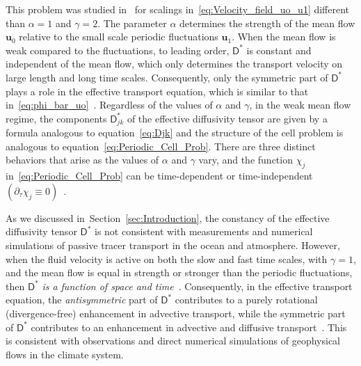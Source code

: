 \documentclass[leqno,onefignum,onetabnum]{siamltex1213}
\newcommand{\secref}[1]{Section~\ref{#1}}
\newcommand{\Dm}{\mathsf{D}}
\newcommand{\vecu}{\boldsymbol{u}}
\begin{document}
This problem was studied in~\cite{Pavliotis:PHD_Thesis} for 
scalings in~\eqref{eq:Velocity_field_uo_u1} different than $\alpha=1$ and
$\gamma=2$. The parameter $\alpha$ determines the strength of the mean flow $\vecu_0$
relative to the small scale periodic fluctuations $\vecu_1$. When the
mean flow is weak compared to the fluctuations, to leading order,
$\Dm^*$ is constant and independent of the mean flow, which only
determines the transport velocity on large length and long time
scales. Consequently, only the symmetric part of $\Dm^*$ plays a role
in the effective transport equation, which is similar to that
in~\eqref{eq:phi_bar_uo}~\cite{Pavliotis:PHD_Thesis}. Regardless of
the values of $\alpha$ and $\gamma$, in the weak mean flow regime, the
components $\Dm^*_{jk}$ of the effective diffusivity tensor are given
by a formula analogous to equation~\eqref{eq:Djk} and the structure of
the cell problem is analogous to
equation~\eqref{eq:Periodic_Cell_Prob}. There are three distinct
behaviors that arise as the values of $\alpha$ and $\gamma$ vary, and the
function $\chi_j$ in~\eqref{eq:Periodic_Cell_Prob} can be time-dependent
or time-independent $(\partial_\tau\chi_j\equiv0)$~\cite{Pavliotis:PHD_Thesis}.



As we discussed in~\secref{sec:Introduction}, the constancy of the
effective diffusivity tensor $\Dm^*$ is not consistent with
measurements and numerical simulations of passive tracer transport in
the ocean and atmosphere. However, when the fluid velocity is active
on both the slow and fast time scales, with $\gamma=1$, and the mean flow
is equal in strength or stronger than the periodic fluctuations, then
$\Dm^*$ \emph{ is a function of space and
  time}~\cite{Pavliotis:PHD_Thesis}. Consequently, in the effective  
transport equation, the \emph{antisymmetric} part of $\Dm^*$ contributes to a
purely rotational (divergence-free) enhancement in advective
transport, while the symmetric part of $\Dm^*$ contributes to an
enhancement in advective and diffusive
transport~\cite{Pavliotis:PHD_Thesis}. This is consistent with
observations and direct numerical simulations of geophysical flows in
the climate system. 
\end{document}
